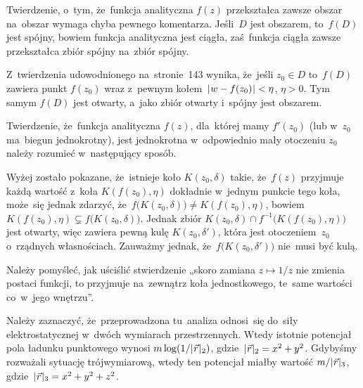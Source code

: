 \documentclass[a4paper,11pt]{article}
\numberwithin{equation}{section}
\begin{document}
\VerSpaceFour





\noindent
{} Twierdzenie, o~tym, że~funkcja analityczna $f( z )$ przekształca
zawsze obszar na~obszar wymaga chyba pewnego komentarza. Jeśli~$D$ jest
obszarem, to~$f( D )$ jest spójny, bowiem funkcja analityczna jest ciągła,
zaś~funkcja ciągła zawsze przekształca zbiór spójny na~zbiór spójny.

Z~twierdzenia udowodnionego na~stronie~143 wynika, że~jeśli
$z_{ 0 } \in D$ to~$f( D )$ zawiera punkt $f( z_{ 0 } )$ wraz z~pewnym
kołem~$| \hspace{0.05em}  w - f( z_{ 0 } )  \hspace{0.05em} | < \eta$, $\eta > 0$. Tym samym
$f( D )$ jest otwarty, a~jako zbiór otwarty i~spójny jest obszarem.

\VerSpaceFour





\noindent
{} Twierdzenie, że~funkcja analityczna $f( z )$, dla~której mamy
$f'( z_{ 0 } )$ (lub w~$z_{ 0 }$ ma~biegun jednokrotny), jest jednokrotna
w~odpowiednio mały otoczeniu $z_{ 0 }$ należy rozumieć w~następujący sposób.

Wyżej zostało pokazane, że~istnieje koło $K( z_{ 0 }, \delta )$ takie,
że~$f( z )$ przyjmuje każdą wartość z~koła $K( f( z_{ 0 } ), \eta )$
dokładnie w~jednym punkcie tego koła, może~się jednak zdarzyć,
że~$f\big( K( z_{ 0 }, \delta ) \big) \neq K( f( z_{ 0 } ), \eta )$, bowiem
$K( f( z_{ 0 } ), \eta ) \subsetneq f\big( K( z_{ 0 }, \delta ) \big)$. Jednak zbiór
$K( z_{ 0 }, \delta ) \cap f^{ -1 }\big( K( f( z_{ 0 } ), \eta ) \big)$ jest otwarty,
więc zawiera pewną kulę $K( z_{ 0 }, \delta' )$, która jest otoczeniem~$z_{ 0 }$
o~rządnych własnościach. Zauważmy jednak,
że~$f\big( K( z_{ 0 }, \delta' ) \big)$ nie~musi być kulą.

\VerSpaceFour





\noindent
{} Należy pomyśleć, jak uściślić stwierdzenie „skoro zamiana
$z \mapsto 1 / z$ nie zmienia postaci funkcji, to przyjmuje na~zewnątrz koła
jednostkowego, te~same wartości co~w~jego wnętrzu”.

\VerSpaceFour





\noindent
{} Należy zaznaczyć, że~przeprowadzona tu~analiza odnosi~się
do~siły elektrostatycznej w~dwóch wymiarach przestrzennych. Wtedy istotnie
potencjał pola ładunku punktowego wynosi
$m \log( 1 / | \hspace{0.05em}  \vec{r}  \hspace{0.05em} |_{ 2 } )$,
gdzie~$| \hspace{0.05em}  \vec{r}  \hspace{0.05em} |_{ 2 } = x^{ 2 } + y^{ 2 }$. Gdybyśmy rozważali
sytuację trójwymiarową, wtedy ten potencjał miałby wartość
$m / | \hspace{0.05em}  \vec{r}  \hspace{0.05em} |_{ 3 }$,
gdzie~$| \hspace{0.05em}  \vec{r}  \hspace{0.05em} |_{ 3 } = x^{ 2 } + y^{ 2 } + z^{ 2 }$.
\end{document}
